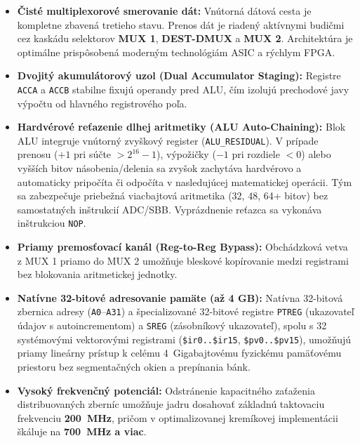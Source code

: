 \documentclass[11pt,a4paper]{article}
\newcommand{\reg}[1]{\texttt{#1}}
\begin{document}
\begin{itemize}
  \item \textbf{Čisté multiplexorové smerovanie dát:} Vnútorná dátová cesta je kompletne zbavená tretieho stavu. Prenos dát je riadený aktívnymi budičmi cez kaskádu selektorov \textbf{MUX 1}, \textbf{DEST-DMUX} a \textbf{MUX 2}. Architektúra je optimálne prispôsobená moderným technológiám ASIC a rýchlym FPGA.
  \item \textbf{Dvojitý akumulátorový uzol (Dual Accumulator Staging):} Registre \reg{ACCA} a \reg{ACCB} stabilne fixujú operandy pred ALU, čím izolujú prechodové javy výpočtu od hlavného registrového poľa.
  \item \textbf{Hardvérové reťazenie dlhej aritmetiky (ALU Auto-Chaining):} Blok ALU integruje vnútorný zvyškový register (\reg{ALU\_RESIDUAL}). V prípade prenosu ($+1$ pri súčte $>2^{16}-1$), výpožičky ($-1$ pri rozdiele $<0$) alebo vyšších bitov násobenia/delenia sa zvyšok zachytáva hardvérovo a automaticky pripočíta či odpočíta v nasledujúcej matematickej operácii. Tým sa zabezpečuje priebežná viacbajtová aritmetika (32, 48, 64+ bitov) bez samostatných inštrukcií ADC/SBB. Vyprázdnenie reťazca sa vykonáva inštrukciou \texttt{NOP}.
  \item \textbf{Priamy premosťovací kanál (Reg-to-Reg Bypass):} Obchádzková vetva z MUX 1 priamo do MUX 2 umožňuje bleskové kopírovanie medzi registrami bez blokovania aritmetickej jednotky.
  \item \textbf{Natívne 32-bitové adresovanie pamäte (až 4 GB):} Natívna 32-bitová zbernica adresy (\texttt{A0}--\texttt{A31}) a špecializované 32-bitové registre \reg{PTREG} (ukazovateľ údajov s autoincrementom) a \reg{SREG} (zásobníkový ukazovateľ), spolu s 32 systémovými vektorovými registrami (\texttt{\$ir0..\$ir15}, \texttt{\$pv0..\$pv15}), umožňujú priamy lineárny prístup k celému 4~Gigabajtovému fyzickému pamäťovému priestoru bez segmentačných okien a prepínania bánk.
  \item \textbf{Vysoký frekvenčný potenciál:} Odstránenie kapacitného zaťaženia distribuovaných zberníc umožňuje jadru dosahovať základnú taktovaciu frekvenciu \textbf{200~MHz}, pričom v optimalizovanej kremíkovej implementácii škáluje na \textbf{700~MHz a viac}.
\end{itemize}
\end{document}
